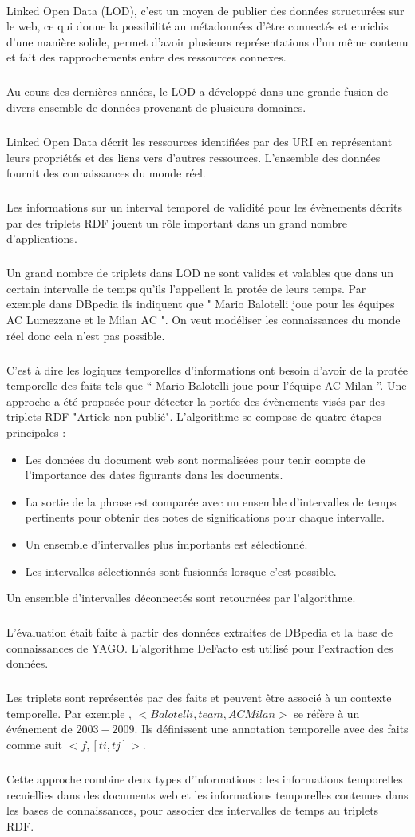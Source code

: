 \paragraph{}
Linked Open Data (LOD), c'est un moyen de publier des données structurées sur le web, ce qui donne la possibilité au métadonnées d'être connectés et enrichis d'une manière solide, permet d'avoir plusieurs représentations d'un même contenu et fait des rapprochements entre des ressources connexes. 
\subparagraph{}
Au cours des dernières années, le LOD a développé dans une grande fusion de divers ensemble de données provenant de plusieurs domaines.
\subparagraph{}
Linked Open Data décrit les ressources identifiées par des URI en représentant leurs propriétés et des liens vers d’autres ressources.
L'ensemble des données fournit des connaissances du monde réel.
\subparagraph{}
Les informations sur un interval temporel de validité pour les évènements décrits par des triplets RDF jouent un rôle important dans un grand nombre d'applications.
\subparagraph{}
Un grand nombre de triplets dans LOD ne sont valides et valables que dans un certain intervalle de temps qu'ils l'appellent la protée de leurs temps.
Par exemple dans DBpedia ils indiquent que " Mario Balotelli joue pour les équipes AC Lumezzane et le Milan AC ". On veut modéliser les connaissances du monde réel donc cela n'est pas possible.
\subparagraph{}
C'est à dire les logiques temporelles d'informations ont besoin d'avoir de la protée temporelle des faits tels que “ Mario Balotelli joue pour l'équipe AC Milan ”.
Une approche a été proposée pour détecter la portée des évènements visés par des triplets RDF "Article non publié".
\newline
L'algorithme se compose de quatre étapes principales :
\begin{itemize}
\item Les données du document web sont normalisées pour tenir compte de l’importance des dates figurants dans les documents.
\item La sortie de la phrase est comparée avec un ensemble d’intervalles de temps pertinents pour obtenir des notes de significations pour chaque intervalle.
\item Un ensemble d’intervalles plus importants est sélectionné.
\item Les intervalles sélectionnés sont fusionnés lorsque c’est possible.
\end{itemize}
Un ensemble d'intervalles déconnectés sont retournées par l’algorithme.   
\subparagraph{}
L'évaluation était faite à partir des données extraites de DBpedia et la base de connaissances de YAGO.
L’algorithme DeFacto est utilisé pour l’extraction des données.
\subparagraph{}
Les triplets sont représentés par des faits et peuvent être associé à un contexte temporelle.
Par exemple , $<Balotelli, team, AC Milan>$ se réfère à un événement de $2003-2009$. 
Ils définissent une annotation temporelle avec des faits comme suit $<f, [ti,tj]>$.
\subparagraph{}
Cette approche combine deux types d'informations : les informations temporelles recuiellies dans des documents web et les informations temporelles contenues dans les bases de connaissances, pour associer des intervalles de temps au triplets RDF.
